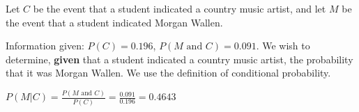 \documentclass[noanswers]{exam}
\begin{document}
\begin{questions}
\begin{solution}[\stretch{1}]
	\vspace{3mm}
	
	Let $C$ be the event that a student indicated a country music artist, and let $M$ be the event that a student indicated Morgan Wallen.
	
	\vspace{3mm}
	
	Information given: $P(C)=0.196$, $P(M\text{ and }C)=0.091$. We wish to determine, \textbf{given} that a student indicated a country music artist, the probability that it was Morgan Wallen. We use the definition of conditional probability.
	
	\vspace{3mm}
	
	$P(M|C)=\displaystyle\frac{P(M\text{ and }C)}{P(C)}=\frac{0.091}{0.196}=0.4643$
	
	\vspace{3mm}
	
	\end{solution}
	
\end{questions}

\end{document}
